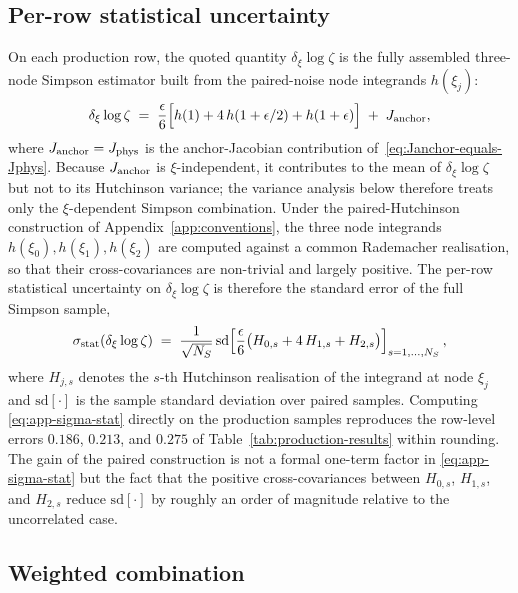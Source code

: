 \documentclass[a4paper,11pt]{article}
\theoremstyle{definition}
\newcommand{\Jphys}{J_{\rm phys}}
\begin{document}
\subsection{Per-row statistical uncertainty}
\label{app:err-row-statistical}

On each production row, the quoted quantity $\delta_\xi \log\zeta$ is the
fully assembled three-node Simpson estimator built from the paired-noise
node integrands $h(\xi_j)$:
\begin{equation}
\delta_\xi \log\zeta \;=\;
\frac{\epsilon}{6}\Bigl[h(1) + 4\,h(1+\epsilon/2) + h(1+\epsilon)\Bigr]
\;+\; J_{\rm anchor},
\label{eq:app-simpson}
\end{equation}
where $J_{\rm anchor} = \Jphys$ is the anchor-Jacobian contribution
of~\eqref{eq:Janchor-equals-Jphys}. Because $J_{\rm anchor}$ is
$\xi$-independent, it contributes to the mean of $\delta_\xi \log\zeta$
but not to its Hutchinson variance; the variance analysis below
therefore treats only the $\xi$-dependent Simpson combination.
Under the paired-Hutchinson construction of
Appendix~\ref{app:conventions}, the three node integrands
$h(\xi_0), h(\xi_1), h(\xi_2)$ are computed against a common
Rademacher realisation, so that their cross-covariances are
non-trivial and largely positive. The per-row statistical
uncertainty on $\delta_\xi \log\zeta$ is therefore the standard
error of the full Simpson sample,
\begin{equation}
\sigma_{\rm stat}(\delta_\xi \log\zeta)
\;=\;
\frac{1}{\sqrt{N_S}}\,
\mathrm{sd}\!\left[
\frac{\epsilon}{6}\bigl(
H_{0,s} + 4\,H_{1,s} + H_{2,s}
\bigr)
\right]_{s = 1,\dots,N_S},
\label{eq:app-sigma-stat}
\end{equation}
where $H_{j,s}$ denotes the $s$-th Hutchinson realisation of the
integrand at node $\xi_j$ and $\mathrm{sd}[\cdot]$ is the
sample standard deviation over paired samples. Computing
\eqref{eq:app-sigma-stat} directly on the production samples
reproduces the row-level errors $0.186$, $0.213$, and $0.275$ of
Table~\ref{tab:production-results} within rounding. The gain of
the paired construction is not a formal one-term factor in
\eqref{eq:app-sigma-stat} but the fact that the positive
cross-covariances between $H_{0,s}$, $H_{1,s}$, and $H_{2,s}$
reduce $\mathrm{sd}[\cdot]$ by roughly an order of magnitude
relative to the uncorrelated case.

\subsection{Weighted combination}
\label{app:err-weighted}
\end{document}
